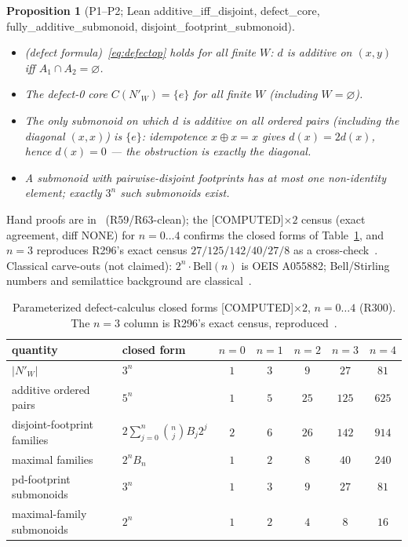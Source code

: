 \documentclass[11pt,a4paper]{article}
\newtheorem{proposition}{Proposition}
\theoremstyle{definition}
\begin{document}
\begin{proposition}[P1--P2; Lean additive\_iff\_disjoint, defect\_core,
  fully\_additive\_submonoid, disjoint\_footprint\_submonoid]
  \label{prop:p}
  \begin{itemize}
  \item[P1] (defect formula)~\eqref{eq:defectop} holds for all finite
    $W$: $d$ is additive on $(x,y)$ iff $A_1\cap A_2=\varnothing$.
  \item[P2(i)] The defect-0 core $C(N'_W)=\{e\}$ for all finite $W$
    (including $W=\varnothing$).
  \item[P2(ii)] The only submonoid on which $d$ is additive on
    \emph{all} ordered pairs (including the diagonal $(x,x)$) is
    $\{e\}$: idempotence $x\oplus x=x$ gives
    $d(x)=2d(x)$, hence $d(x)=0$ — the obstruction is exactly the
    diagonal.
  \item[P2(iii)(a)] A submonoid with pairwise-disjoint footprints has at
    most one non-identity element; exactly $3^n$ such submonoids exist.
  \end{itemize}
\end{proposition}

Hand proofs are in~\cite{D300} (R59/R63-clean); the [COMPUTED]$\times2$
census (exact agreement, diff NONE) for $n=0\ldots4$ confirms the closed
forms of Table~\ref{tab:census}, and $n=3$ reproduces R296's exact
census $27/125/142/40/27/8$ as a cross-check~\cite{D300}. Classical
carve-outs (not claimed): $2^n\!\cdot\!\mathrm{Bell}(n)$ is OEIS A055882;
Bell/Stirling numbers and semilattice background are classical~\cite{D300}.

\begin{table}[t]
  \centering
  \caption{Parameterized defect-calculus closed forms [COMPUTED]$\times2$,
    $n=0\ldots4$ (R300). The $n=3$ column is R296's exact census,
    reproduced~\cite{D300}.}
  \label{tab:census}
  \begin{tabular}{llccccc}
    \toprule
    quantity & closed form & $n{=}0$ & $n{=}1$ & $n{=}2$ & $n{=}3$ & $n{=}4$ \\
    \midrule
    $|N'_W|$ & $3^n$ & $1$ & $3$ & $9$ & $27$ & $81$ \\
    additive ordered pairs & $5^n$ & $1$ & $5$ & $25$ & $125$ & $625$ \\
    disjoint-footprint families &
      $2\sum_{j=0}^n\binom{n}{j}B_j2^j$ &
      $2$ & $6$ & $26$ & $142$ & $914$ \\
    maximal families & $2^n B_n$ & $1$ & $2$ & $8$ & $40$ & $240$ \\
    pd-footprint submonoids & $3^n$ & $1$ & $3$ & $9$ & $27$ & $81$ \\
    maximal-family submonoids & $2^n$ & $1$ & $2$ & $4$ & $8$ & $16$ \\
    \bottomrule
  \end{tabular}
\end{table}
\end{document}

